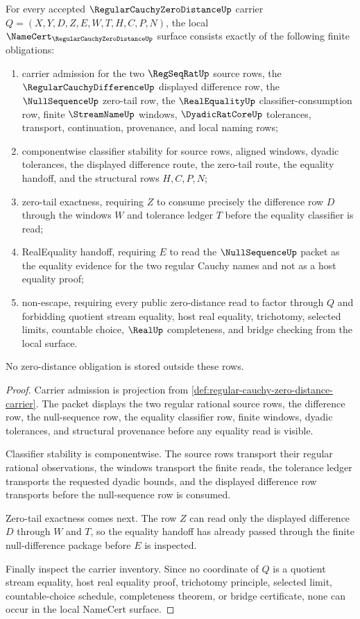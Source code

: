 \begin{theorem}
\label{thm:regular-cauchy-zero-distance-namecert-obligations}
For every accepted $\RegularCauchyZeroDistanceUp$ carrier $Q=(X,Y,D,Z,E,W,T,H,C,P,N)$, the local $\NameCert_{\RegularCauchyZeroDistanceUp}$ surface consists exactly of the following finite obligations:
\begin{enumerate}
\item carrier admission for the two $\RegSeqRatUp$ source rows, the $\RegularCauchyDifferenceUp$ displayed difference row, the $\NullSequenceUp$ zero-tail row, the $\RealEqualityUp$ classifier-consumption row, finite $\StreamNameUp$ windows, $\DyadicRatCoreUp$ tolerances, transport, continuation, provenance, and local naming rows;
\item componentwise classifier stability for source rows, aligned windows, dyadic tolerances, the displayed difference route, the zero-tail route, the equality handoff, and the structural rows $H,C,P,N$;
\item zero-tail exactness, requiring $Z$ to consume precisely the difference row $D$ through the windows $W$ and tolerance ledger $T$ before the equality classifier is read;
\item RealEquality handoff, requiring $E$ to read the $\NullSequenceUp$ packet as the equality evidence for the two regular Cauchy names and not as a host equality proof;
\item non-escape, requiring every public zero-distance read to factor through $Q$ and forbidding quotient stream equality, host real equality, trichotomy, selected limits, countable choice, $\RealUp$ completeness, and bridge checking from the local surface.
\end{enumerate}
No zero-distance obligation is stored outside these rows.
\end{theorem}
\begin{proof}
Carrier admission is projection from \autoref{def:regular-cauchy-zero-distance-carrier}. The packet displays the two regular rational source rows, the difference row, the null-sequence row, the equality classifier row, finite windows, dyadic tolerances, and structural provenance before any equality read is visible.

Classifier stability is componentwise. The source rows transport their regular rational observations, the windows transport the finite reads, the tolerance ledger transports the requested dyadic bounds, and the displayed difference row transports before the null-sequence row is consumed.

Zero-tail exactness comes next. The row $Z$ can read only the displayed difference $D$ through $W$ and $T$, so the equality handoff has already passed through the finite null-difference package before $E$ is inspected.

Finally inspect the carrier inventory. Since no coordinate of $Q$ is a quotient stream equality, host real equality proof, trichotomy principle, selected limit, countable-choice schedule, completeness theorem, or bridge certificate, none can occur in the local NameCert surface.
\end{proof}

